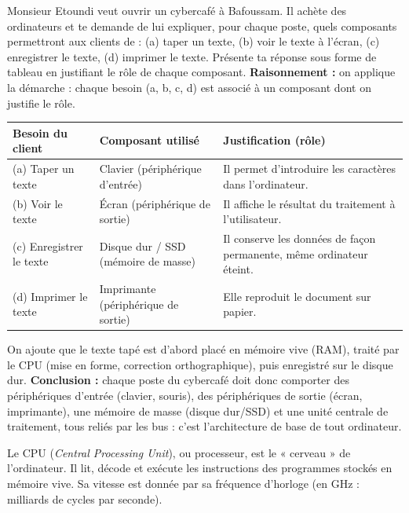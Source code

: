 \documentclass[11pt]{article}
\newcommand{\cle}[1]{{\popxbold\color{popdark}#1}}
\newcounter{popsec}
\newcounter{popsub}
\newcommand{\courssub}[1]{%
  \stepcounter{popsub}%
  \par\vspace{9pt}\noindent{\popxbold\fontsize{11.5}{13}\selectfont\color{popink}{\color{poporange}\thepopsec.\thepopsub}\hspace{6pt}#1}\par\nopagebreak\vspace{4pt}
}
\begin{document}
\begin{exoresolu}
Monsieur Etoundi veut ouvrir un cybercafé à Bafoussam. Il achète des ordinateurs et te demande de lui expliquer, pour chaque poste, quels composants permettront aux clients de : (a) taper un texte, (b) voir le texte à l'écran, (c) enregistrer le texte, (d) imprimer le texte. Présente ta réponse sous forme de tableau en justifiant le rôle de chaque composant.
\tcblower
\textbf{Raisonnement :} on applique la démarche : chaque besoin (a, b, c, d) est associé à un composant dont on justifie le rôle.
\begin{center}
\begin{tabularx}{\linewidth}{|l|X|X|}
\hline
\rowcolor{popblueL}
\textbf{Besoin du client} & \textbf{Composant utilisé} & \textbf{Justification (rôle)} \\
\hline
(a) Taper un texte & Clavier (périphérique d'entrée) & Il permet d'introduire les caractères dans l'ordinateur. \\
\hline
(b) Voir le texte & Écran (périphérique de sortie) & Il affiche le résultat du traitement à l'utilisateur. \\
\hline
(c) Enregistrer le texte & Disque dur / SSD (mémoire de masse) & Il conserve les données de façon permanente, même ordinateur éteint. \\
\hline
(d) Imprimer le texte & Imprimante (périphérique de sortie) & Elle reproduit le document sur papier. \\
\hline
\end{tabularx}
\end{center}
On ajoute que le texte tapé est d'abord placé en \cle{mémoire vive} (RAM), traité par le \cle{CPU} (mise en forme, correction orthographique), puis enregistré sur le disque dur.
\textbf{Conclusion :} chaque poste du cybercafé doit donc comporter des périphériques d'entrée (clavier, souris), des périphériques de sortie (écran, imprimante), une mémoire de masse (disque dur/SSD) et une unité centrale de traitement, tous reliés par les bus : c'est l'architecture de base de tout ordinateur.
\end{exoresolu}

\courssub{L'unité centrale de traitement (CPU)}

\begin{definition}
Le \cle{CPU} (\emph{Central Processing Unit}), ou \cle{processeur}, est le « cerveau » de l'ordinateur. Il lit, décode et exécute les instructions des programmes stockés en mémoire vive. Sa vitesse est donnée par sa \cle{fréquence d'horloge} (en GHz : milliards de cycles par seconde).
\end{definition}
\end{document}
